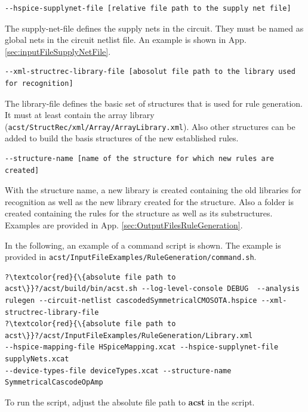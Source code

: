 \begin{lstlisting}[basicstyle=\ttfamily\scriptsize,backgroundcolor={\color{gray!30}}, escapechar=? ]
--hspice-supplynet-file [relative file path to the supply net file]
\end{lstlisting}
The supply-net-file defines the supply nets in the circuit. They must be named as global nets in the circuit netlist file. An example is shown in App. \ref{sec:inputFileSupplyNetFile}.
\\

\begin{lstlisting}[basicstyle=\ttfamily\scriptsize,backgroundcolor={\color{gray!30}}, escapechar=? ]
--xml-structrec-library-file [abosolut file path to the library used for recognition] 
\end{lstlisting}
The library-file defines the basic set of structures that is used for rule generation. It must at least contain the array library ({\tt acst/StructRec/xml/Array/ArrayLibrary.xml}). Also other structures can be added to build the basis structures of the new established rules.
\\

\begin{lstlisting}[basicstyle=\ttfamily\scriptsize,backgroundcolor={\color{gray!30}}, escapechar=? ]
--structure-name [name of the structure for which new rules are created] 
\end{lstlisting}
With the structure name, a new library is created containing the old libraries for recognition as well as the new library created for the structure. Also a folder is created containing the rules for the structure as well as its substructures. Examples are provided in App. \ref{sec:OutputFilesRuleGeneration}.

In the following, an example of a command script is shown. The example is provided in {\tt acst/InputFileExamples/RuleGeneration/command.sh}.
\begin{lstlisting}[basicstyle=\ttfamily\scriptsize,backgroundcolor={\color{gray!30}}, escapechar=? ]
?\textcolor{red}{\{absolute file path to acst\}}?/acst/build/bin/acst.sh --log-level-console DEBUG  --analysis 
rulegen --circuit-netlist cascodedSymmetricalCMOSOTA.hspice --xml-structrec-library-file
?\textcolor{red}{\{absolute file path to acst\}}?/acst/InputFileExamples/RuleGeneration/Library.xml 
--hspice-mapping-file HSpiceMapping.xcat --hspice-supplynet-file supplyNets.xcat 
--device-types-file deviceTypes.xcat --structure-name SymmetricalCascodeOpAmp
\end{lstlisting}
To run the script, adjust the absolute file path to {\bf acst} in the script.


